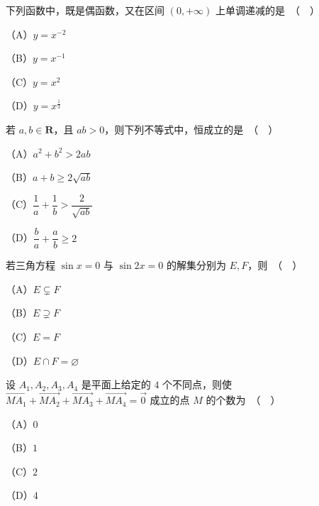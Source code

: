 \begin{question}
下列函数中，既是偶函数，又在区间 $(0,+\infty)$ 上单调递减的是　（　）

（A）$y=x^{-2}$

（B）$y=x^{-1}$

（C）$y=x^2$

（D）$y=x^{\frac13}$

\end{question}
\begin{question}
若 $a,b\in\mathbf R$，且 $ab>0$，则下列不等式中，恒成立的是　（　）

（A）$a^2+b^2>2ab$

（B）$a+b\geqslant 2\sqrt{ab}$

（C）$\dfrac1a+\dfrac1b>\dfrac{2}{\sqrt{ab}}$

（D）$\dfrac ba+\dfrac ab\geqslant 2$

\end{question}
\begin{question}
若三角方程 $\sin x=0$ 与 $\sin 2x=0$ 的解集分别为 $E,F$，则　（　）

（A）$E\subsetneq F$

（B）$E\supsetneq F$

（C）$E=F$

（D）$E\cap F=\varnothing$

\end{question}
\begin{question}
设 $A_1,A_2,A_3,A_4$ 是平面上给定的 $4$ 个不同点，则使 $\overrightarrow{MA_1}+\overrightarrow{MA_2}+\overrightarrow{MA_3}+\overrightarrow{MA_4}=\vec 0$ 成立的点 $M$ 的个数为　（　）

（A）$0$

（B）$1$

（C）$2$

（D）$4$

\end{question}

